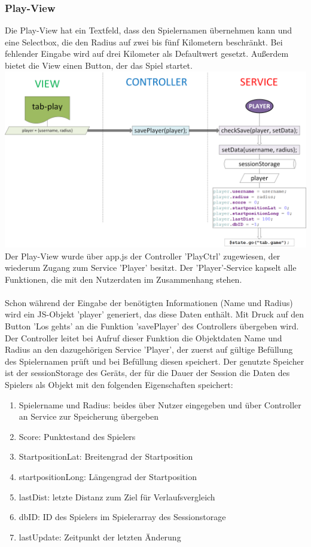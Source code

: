 \subsubsection{Play-View}
%
%
Die Play-View hat ein Textfeld, dass den Spielernamen übernehmen kann und eine Selectbox, die den Radius auf zwei bis fünf Kilometern beschränkt. Bei fehlender Eingabe wird auf drei Kilometer als Defaultwert gesetzt. Außerdem bietet die View einen Button, der das Spiel startet. 
%
%
\\ \includegraphics[width=1\textwidth]{ref/images/02-play-tab.png} \\
%
%
Der Play-View wurde über app.js der Controller 'PlayCtrl' zugewiesen, der wiederum Zugang zum Service 'Player' besitzt. Der 'Player'-Service kapselt alle Funktionen, die mit den Nutzerdaten im Zusammenhang stehen.
\\
\\
Schon während der Eingabe der benötigten Informationen (Name und Radius) wird ein JS-Objekt 'player' generiert, das diese Daten enthält. Mit Druck auf den Button 'Los gehts' an die Funktion 'savePlayer' des Controllers übergeben wird. 
\\
Der Controller leitet bei Aufruf dieser Funktion die Objektdaten Name und Radius an den dazugehörigen Service 'Player', der zuerst auf gültige Befüllung des Spielernamen prüft und bei Befüllung diesen speichert. Der genutzte Speicher ist der sessionStorage des Geräts, der für die Dauer der Session die Daten des Spielers als Objekt mit den folgenden Eigenschaften speichert: 
\begin{enumerate}
\item Spielername und Radius: beides über Nutzer eingegeben und über Controller an Service zur Speicherung übergeben
\item Score: Punktestand des Spielers
\item StartpositionLat: Breitengrad der Startposition
\item startpositionLong: Längengrad der Startposition
\item lastDist: letzte Distanz zum Ziel für Verlaufsvergleich
\item dbID: ID des Spielers im Spielerarray des Sessionstorage
\item lastUpdate: Zeitpunkt der letzten Änderung
\end{enumerate}
